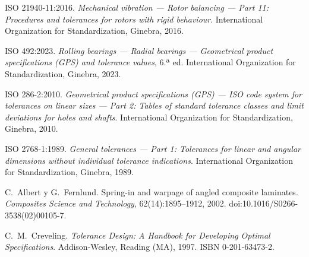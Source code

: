  ISO 21940-11:2016. \emph{Mechanical vibration --- Rotor
  balancing --- Part 11: Procedures and tolerances for rotors with rigid behaviour}.
  International Organization for Standardization, Ginebra, 2016.

 ISO 492:2023. \emph{Rolling bearings --- Radial bearings ---
  Geometrical product specifications (GPS) and tolerance values}, 6.ª ed. International
  Organization for Standardization, Ginebra, 2023.

 ISO 286-2:2010. \emph{Geometrical product specifications
  (GPS) --- ISO code system for tolerances on linear sizes --- Part 2: Tables of standard
  tolerance classes and limit deviations for holes and shafts}. International Organization
  for Standardization, Ginebra, 2010.

 ISO 2768-1:1989. \emph{General tolerances --- Part 1:
  Tolerances for linear and angular dimensions without individual tolerance indications}.
  International Organization for Standardization, Ginebra, 1989.

 C.~Albert y G.~Fernlund. Spring-in and warpage of angled
  composite laminates. \emph{Composites Science and Technology}, 62(14):1895--1912, 2002.
  doi:10.1016/S0266-3538(02)00105-7.

 C.~M.~Creveling. \emph{Tolerance Design: A Handbook
  for Developing Optimal Specifications}. Addison-Wesley, Reading (MA), 1997.
  ISBN 0-201-63473-2.
